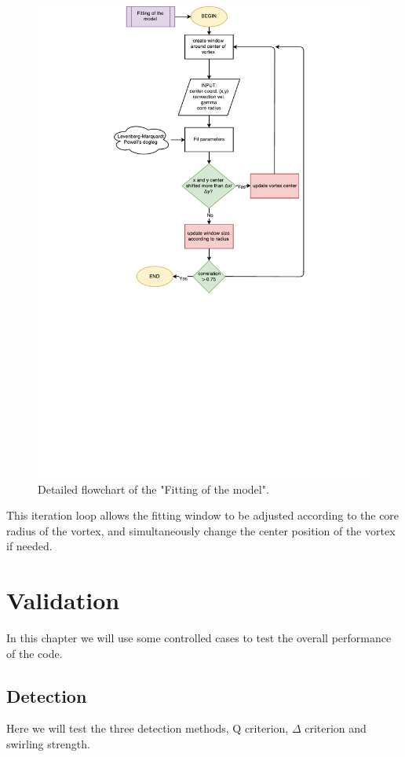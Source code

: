 \documentclass[12pt, a4paper, openany]{memoir}
\begin{document}
\newpage
\begin{figure}[h!]
	\centering
	\includegraphics[trim=50 320 50 0 ,clip, scale=0.8]{figure/FittingFlow.pdf}
	\caption{Detailed flowchart of the "Fitting of the model".}
	\label{fig:fittingfc}
\end{figure}

This iteration loop allows the fitting window to be adjusted according to the core radius of the vortex, and simultaneously change the center position of the vortex if needed. 

\chapter{Validation}
In this chapter we will use some controlled cases to test the overall performance of the code.

\section{Detection}
Here we will test the three detection methods, Q criterion, $\Delta$ criterion and swirling strength.
\end{document}
